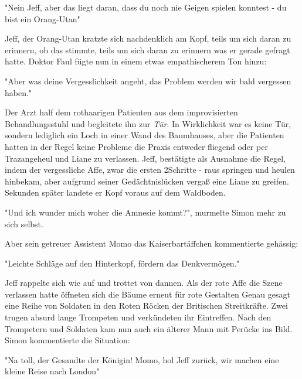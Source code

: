 \documentclass[ebook]{article}
\begin{document}
\begin{center}
"Nein Jeff, aber das liegt daran, dass du noch nie Geigen spielen
konntest - du bist ein Orang-Utan"
\end{center}

\noindent Jeff, der Orang-Utan kratzte sich nachdenklich am Kopf,
teils um sich daran zu erinnern, ob das stimmte, teils um sich daran
zu erinnern was er gerade gefragt hatte. Doktor Faul fügte nun in
einem etwas empathischerem Ton hinzu:

\begin{center}
"Aber was deine Vergesslichkeit angeht, das Problem werden wir bald
vergessen haben."
\end{center}

\noindent Der Arzt half dem rothaarigen Patienten aus dem
improvisierten Behandlungsstuhl und begleitete ihn zur \emph{Tür}. In
Wirklichkeit war es keine Tür, sondern lediglich ein Loch in einer
Wand des Baumhauses, aber die Patienten hatten in der Regel
keine Probleme die Praxis entweder fliegend oder per Trazangeheul
und Liane zu verlassen. Jeff, bestätigte als Ausnahme die Regel,
indem der vergessliche Affe, zwar die ersten 2Schritte -
raus springen und heulen hinbekam, aber aufgrund seiner
Gedächtnislücken vergaß eine Liane zu greifen. Sekunden später
landete er Kopf voraus auf dem Waldboden.

\begin{center}
"Und ich wunder mich woher die Amnesie kommt?", murmelte Simon mehr
zu sich selbst.
\end{center}

\noindent Aber sein getreuer Assistent Momo das Kaiserbartäffchen
kommentierte gehässig:

\begin{center}
"Leichte Schläge auf den Hinterkopf, fördern das Denkvermögen."
\end{center}

\noindent Jeff rappelte sich wie auf und trottet von dannen. Als der
rote Affe die Szene verlassen hatte öffneten sich die Bäume erneut
für rote Gestalten Genau gesagt eine Reihe von Soldaten in den
Roten Röcken der Britischen Streitkräfte. Zwei trugen absurd lange
Trompeten und verkündeten ihr Eintreffen. Nach den Trompetern und
Soldaten kam nun auch ein älterer Mann mit Perücke ins Bild. Simon
kommentierte die Situation:

\begin{center}
"Na toll, der Gesandte der Königin! Momo, hol Jeff zurück, wir
machen eine kleine Reise nach London"
\end{center}
\end{document}
